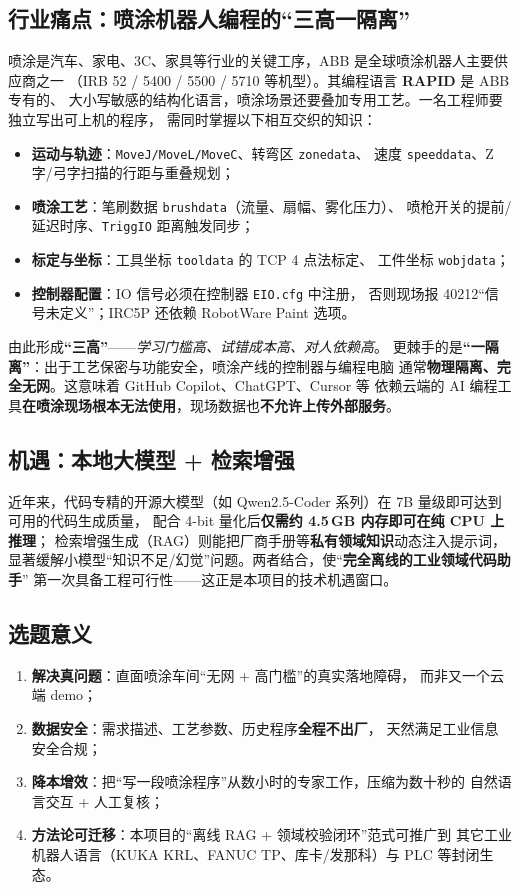 \documentclass[12pt,a4paper,fontset=none]{ctexart}
\begin{document}
\subsection{行业痛点：喷涂机器人编程的“三高一隔离”}
喷涂是汽车、家电、3C、家具等行业的关键工序，ABB 是全球喷涂机器人主要供应商之一
（IRB 52 / 5400 / 5500 / 5710 等机型）。其编程语言 \textbf{RAPID} 是 ABB 专有的、
大小写敏感的结构化语言，喷涂场景还要叠加专用工艺。一名工程师要独立写出可上机的程序，
需同时掌握以下相互交织的知识：

\begin{itemize}
  \item \textbf{运动与轨迹}：\texttt{MoveJ/MoveL/MoveC}、转弯区 \texttt{zonedata}、
        速度 \texttt{speeddata}、Z 字/弓字扫描的行距与重叠规划；
  \item \textbf{喷涂工艺}：笔刷数据 \texttt{brushdata}（流量、扇幅、雾化压力）、
        喷枪开关的提前/延迟时序、\texttt{TriggIO} 距离触发同步；
  \item \textbf{标定与坐标}：工具坐标 \texttt{tooldata} 的 TCP 4 点法标定、
        工件坐标 \texttt{wobjdata}；
  \item \textbf{控制器配置}：IO 信号必须在控制器 \texttt{EIO.cfg} 中注册，
        否则现场报 40212“信号未定义”；IRC5P 还依赖 RobotWare Paint 选项。
\end{itemize}

由此形成\textbf{“三高”}——\emph{学习门槛高、试错成本高、对人依赖高}。
更棘手的是\textbf{“一隔离”}：出于工艺保密与功能安全，喷涂产线的控制器与编程电脑
通常\textbf{物理隔离、完全无网}。这意味着 GitHub Copilot、ChatGPT、Cursor 等
依赖云端的 AI 编程工具\textbf{在喷涂现场根本无法使用}，现场数据也\textbf{不允许上传外部服务}。

\subsection{机遇：本地大模型 + 检索增强}
近年来，代码专精的开源大模型（如 Qwen2.5-Coder 系列）在 7B 量级即可达到可用的代码生成质量，
配合 4-bit 量化后\textbf{仅需约 4.5\,GB 内存即可在纯 CPU 上推理}；
检索增强生成（RAG）则能把厂商手册等\textbf{私有领域知识}动态注入提示词，
显著缓解小模型“知识不足/幻觉”问题。两者结合，使“\textbf{完全离线的工业领域代码助手}”
第一次具备工程可行性——这正是本项目的技术机遇窗口。

\subsection{选题意义}
\begin{enumerate}
  \item \textbf{解决真问题}：直面喷涂车间“无网 + 高门槛”的真实落地障碍，
        而非又一个云端 demo；
  \item \textbf{数据安全}：需求描述、工艺参数、历史程序\textbf{全程不出厂}，
        天然满足工业信息安全合规；
  \item \textbf{降本增效}：把“写一段喷涂程序”从数小时的专家工作，压缩为数十秒的
        自然语言交互 + 人工复核；
  \item \textbf{方法论可迁移}：本项目的“离线 RAG + 领域校验闭环”范式可推广到
        其它工业机器人语言（KUKA KRL、FANUC TP、库卡/发那科）与 PLC 等封闭生态。
\end{enumerate}
\end{document}
